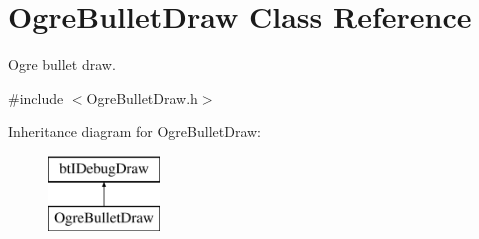 \hypertarget{class_ogre_bullet_draw}{\section{Ogre\-Bullet\-Draw Class Reference}
\label{class_ogre_bullet_draw}
}


Ogre bullet draw.  




{\ttfamily \#include $<$Ogre\-Bullet\-Draw.\-h$>$}

Inheritance diagram for Ogre\-Bullet\-Draw\-:\begin{figure}[H]
\begin{center}
\leavevmode
\includegraphics[height=2.000000cm]{class_ogre_bullet_draw}
\end{center}
\end{figure}
